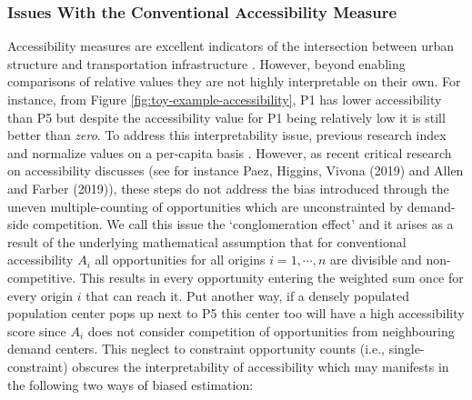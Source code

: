 \documentclass[]{elsarticle} %
\begin{document}
\hypertarget{issues-with-the-conventional-accessibility-measure}{%
\subsubsection{Issues With the Conventional Accessibility
Measure}\label{issues-with-the-conventional-accessibility-measure}}

Accessibility measures are excellent indicators of the intersection
between urban structure and transportation infrastructure . However,
beyond enabling comparisons of relative values they are not highly
interpretable on their own. For instance, from Figure
\ref{fig:toy-example-accessibility}, P1 has lower accessibility than P5
but despite the accessibility value for P1 being relatively low it is
still better than \emph{zero}. To address this interpretability issue,
previous research index and normalize values on a per-capita basis .
However, as recent critical research on accessibility discusses (see for
instance Paez, Higgins, Vivona (2019) and Allen and Farber (2019)),
these steps do not address the bias introduced through the uneven
multiple-counting of opportunities which are unconstrainted by
demand-side competition. We call this issue the `conglomeration effect'
and it arises as a result of the underlying mathematical assumption that
for conventional accessibility \(A_i\) all opportunities for all origins
\(i=1,\cdots,n\) are divisible and non-competitive. This results in
every opportunity entering the weighted sum once for every origin \(i\)
that can reach it. Put another way, if a densely populated population
center pops up next to P5 this center too will have a high accessibility
score since \(A_i\) does not consider competition of opportunities from
neighbouring demand centers. This neglect to constraint opportunity
counts (i.e., single-constraint) obscures the interpretability of
accessibility which may manifests in the following two ways of biased
estimation:
\end{document}
